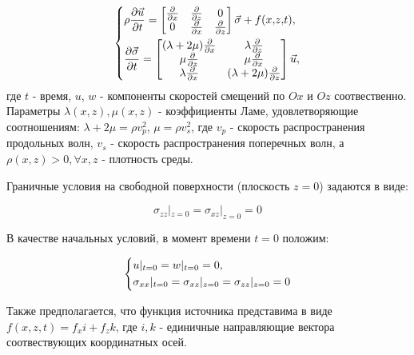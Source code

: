 \begin{equation}
\label{eq:1}
\begin{dcases}
	\rho\frac{\partial{\vec{u}}}{\partial{t}}
	=\begin{bmatrix}
    \frac{\partial{}}{\partial{x}} & \frac{\partial{}}{\partial{z}} & 0 \\
    0 & \frac{\partial{}}{\partial{x}} & \frac{\partial{}}{\partial{z}}
	\end{bmatrix}
	\vec{\sigma} + f(x{,} z{,} t), \\
	\frac{\partial{\vec{\sigma}}}{\partial{t}}
	=\begin{bmatrix}
    (\lambda+2\mu)\frac{\partial{}}{\partial{x}} & \lambda\frac{\partial{}}{\partial{z}} \\
    \mu\frac{\partial{}}{\partial{z}} & \mu\frac{\partial{}}{\partial{x}} \\
    \lambda\frac{\partial{}}{\partial{x}} & (\lambda+2\mu)\frac{\partial{}}{\partial{z}}
	\end{bmatrix}
	\vec{u},
\end{dcases}
\end{equation}
где $t$ - время, $u$, $w$ - компоненты скоростей смещений по $Ox$ и $Oz$ соотвественно.
Параметры $\lambda(x,z), \mu(x,z)$ - коэффициенты Ламе, удовлетворяющие соотношениям: $\lambda + 2\mu=\rho{v}_p^2$, $\mu=\rho{v}_s^2$, 
где $v_p$ - скорость распространения продольных волн, $v_s$ - скорость распространения поперечных волн,
а $\rho(x,z)>0, \forall x,z$ - плотность среды.

Граничные условия на свободной поверхности (плоскость $z = 0$) задаются в виде:

\begin{equation}
	\label{eq:2}
	\sigma_{zz}|_{z=0}=\sigma_{xz}|_{z=0}=0
\end{equation}

В качестве начальных условий, в момент времени $t=0$ положим:

\begin{equation}
\begin{dcases}
	\label{eq:3}
	u |_{t=0}= w|_{t=0} = 0, \\
	\sigma_{xx}|_{t=0}=\sigma_{xz}|_{z=0}=\sigma_{zz}|_{z=0}=0
\end{dcases}
\end{equation}

Также предполагается, что функция источника представима в виде $f(x,z,t)=f_xi+f_zk$,
где $i, k$ - единичные направляющие вектора соотвествующих координатных осей.

